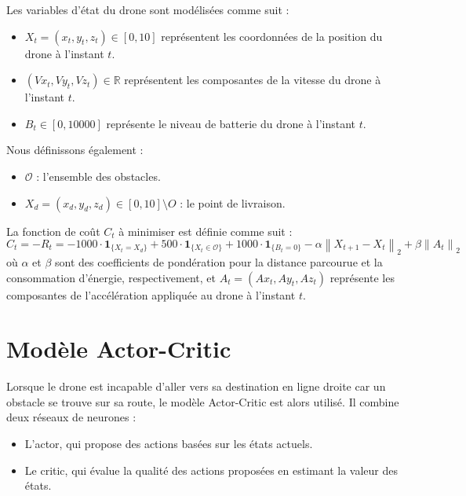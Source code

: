 \documentclass[a4paper, 12pt]{article}
\begin{document}
Les variables d'état du drone sont modélisées comme suit :
\begin{itemize}
    \item $X_t=(x_t, y_t, z_t) \in [0, 10]$ représentent les coordonnées de la position du drone à l'instant $t$.
    \item $(Vx_t, Vy_t, Vz_t) \in \mathbb{R}$ représentent les composantes de la vitesse du drone à l'instant $t$.
    \item $B_t \in [0, 10000]$ représente le niveau de batterie du drone à l'instant $t$.
\end{itemize}

Nous définissons également :
\begin{itemize}
    \item $\mathcal{O}$ : l'ensemble des obstacles.
    \item $X_{d}=(x_d,y_d,z_d) \in [0,10] \setminus O$ : le point de livraison.
   
\end{itemize}

La fonction de coût $C_t$ à minimiser est définie comme suit :
\[
C_t = -R_t = 
-1000 \cdot \mathbf{1}_{\{X_t = X_d\}} + 500 \cdot \mathbf{1}_{\{X_t \in \mathcal{O}\}} + 1000 \cdot \mathbf{1}_{\{B_t = 0\}} - \alpha \left\| X_{t+1} - X_t \right\|_2 + \beta \left\| A_t \right\|_2
\]
où $\alpha$ et $\beta$ sont des coefficients de pondération pour la distance parcourue et la consommation d'énergie, respectivement, et $A_t = (Ax_t, Ay_t, Az_t)$ représente les composantes de l'accélération appliquée au drone à l'instant $t$.
\newpage
\section{Modèle Actor-Critic}
Lorsque le drone est incapable d'aller vers sa destination en ligne droite car un obstacle se trouve sur sa route, le modèle Actor-Critic est alors utilisé. Il combine deux réseaux de neurones :
\begin{itemize}
    \item L'actor, qui propose des actions basées sur les états actuels.
    \item Le critic, qui évalue la qualité des actions proposées en estimant la valeur des états.
\end{itemize}
\end{document}
